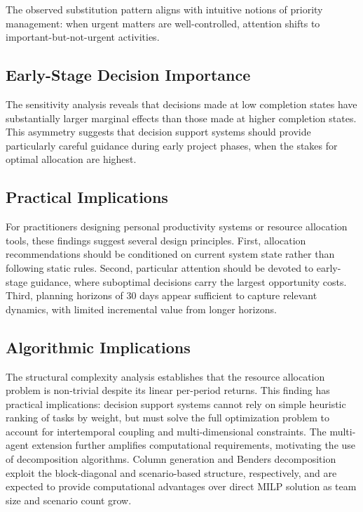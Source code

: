 \documentclass[preprint,review,11pt]{elsarticle}
\begin{document}
The observed substitution pattern aligns with intuitive notions of priority management: when urgent matters are well-controlled, attention shifts to important-but-not-urgent activities. %

\subsection{Early-Stage Decision Importance}

The sensitivity analysis reveals that decisions made at low completion states have substantially larger marginal effects than those made at higher completion states. This asymmetry suggests that decision support systems should provide particularly careful guidance during early project phases, when the stakes for optimal allocation are highest.

\subsection{Practical Implications}

For practitioners designing personal productivity systems or resource allocation tools, these findings suggest several design principles. First, allocation recommendations should be conditioned on current system state rather than following static rules. Second, particular attention should be devoted to early-stage guidance, where suboptimal decisions carry the largest opportunity costs. Third, planning horizons of 30 days appear sufficient to capture relevant dynamics, with limited incremental value from longer horizons.

\subsection{Algorithmic Implications}

The structural complexity analysis establishes that the resource allocation problem is non-trivial despite its linear per-period returns. This finding has practical implications: decision support systems cannot rely on simple heuristic ranking of tasks by weight, but must solve the full optimization problem to account for intertemporal coupling and multi-dimensional constraints. The multi-agent extension further amplifies computational requirements, motivating the use of decomposition algorithms. Column generation and Benders decomposition exploit the block-diagonal and scenario-based structure, respectively, and are expected to provide computational advantages over direct MILP solution as team size and scenario count grow.
\end{document}
